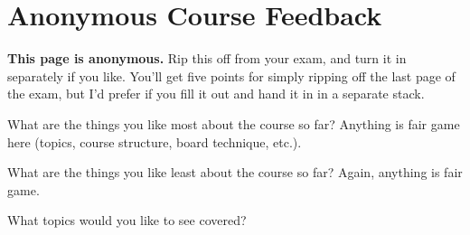 \documentclass[11pt]{article}
\begin{document}
\newpage
\section*{Anonymous Course Feedback}
{\bf This page is anonymous.}  Rip this off from your exam, and turn it
in separately if you like.  You'll get five points for simply ripping
off the last page of the exam, but I'd prefer if you fill it out and
hand it in in a separate stack.
\vspace{.5in}

What are the things you like most about the course so far?  Anything is
fair game here (topics, course structure, board technique, etc.).
\vspace{1.5in}


What are the things you like least about the course so far?  Again,
anything is fair game.
\vspace{1in}


What topics would you like to see covered?
\vspace{1in}



\label{lastpage}
\end{document}
